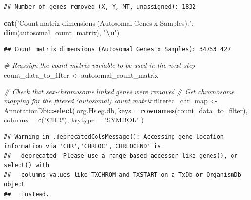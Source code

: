 \documentclass[
]{article}
\newenvironment{Shaded}{\begin{snugshade}}{\end{snugshade}}
\newcommand{\AttributeTok}[1]{\textcolor[rgb]{0.13,0.29,0.53}{#1}}
\newcommand{\CommentTok}[1]{\textcolor[rgb]{0.56,0.35,0.01}{\textit{#1}}}
\newcommand{\FunctionTok}[1]{\textcolor[rgb]{0.13,0.29,0.53}{\textbf{#1}}}
\newcommand{\NormalTok}[1]{#1}
\newcommand{\OtherTok}[1]{\textcolor[rgb]{0.56,0.35,0.01}{#1}}
\newcommand{\SpecialCharTok}[1]{\textcolor[rgb]{0.81,0.36,0.00}{\textbf{#1}}}
\newcommand{\StringTok}[1]{\textcolor[rgb]{0.31,0.60,0.02}{#1}}
\begin{document}
\begin{verbatim}
## Number of genes removed (X, Y, MT, unassigned): 1832
\end{verbatim}

\begin{Shaded}
\begin{Highlighting}[]
\FunctionTok{cat}\NormalTok{(}\StringTok{"Count matrix dimensions (Autosomal Genes x Samples):"}\NormalTok{,}
    \FunctionTok{dim}\NormalTok{(autosomal\_count\_matrix), }\StringTok{"}\SpecialCharTok{\textbackslash{}n}\StringTok{"}\NormalTok{)}
\end{Highlighting}
\end{Shaded}

\begin{verbatim}
## Count matrix dimensions (Autosomal Genes x Samples): 34753 427
\end{verbatim}

\begin{Shaded}
\begin{Highlighting}[]
\CommentTok{\# Reassign the count matrix variable to be used in the next step}
\NormalTok{count\_data\_to\_filter }\OtherTok{\textless{}{-}}\NormalTok{ autosomal\_count\_matrix}
\end{Highlighting}
\end{Shaded}

\begin{Shaded}
\begin{Highlighting}[]
\CommentTok{\# Check that sex{-}chromosome linked genes were removed}
\CommentTok{\# Get chromosome mapping for the filtered (autosomal) count matrix}
\NormalTok{filtered\_chr\_map }\OtherTok{\textless{}{-}}\NormalTok{ AnnotationDbi}\SpecialCharTok{::}\FunctionTok{select}\NormalTok{(}
\NormalTok{  org.Hs.eg.db,}
  \AttributeTok{keys =} \FunctionTok{rownames}\NormalTok{(count\_data\_to\_filter),}
  \AttributeTok{columns =} \FunctionTok{c}\NormalTok{(}\StringTok{"CHR"}\NormalTok{),}
  \AttributeTok{keytype =} \StringTok{"SYMBOL"}
\NormalTok{)}
\end{Highlighting}
\end{Shaded}

\begin{verbatim}
## Warning in .deprecatedColsMessage(): Accessing gene location information via 'CHR','CHRLOC','CHRLOCEND' is
##   deprecated. Please use a range based accessor like genes(), or select() with
##   columns values like TXCHROM and TXSTART on a TxDb or OrganismDb object
##   instead.
\end{verbatim}
\end{document}
